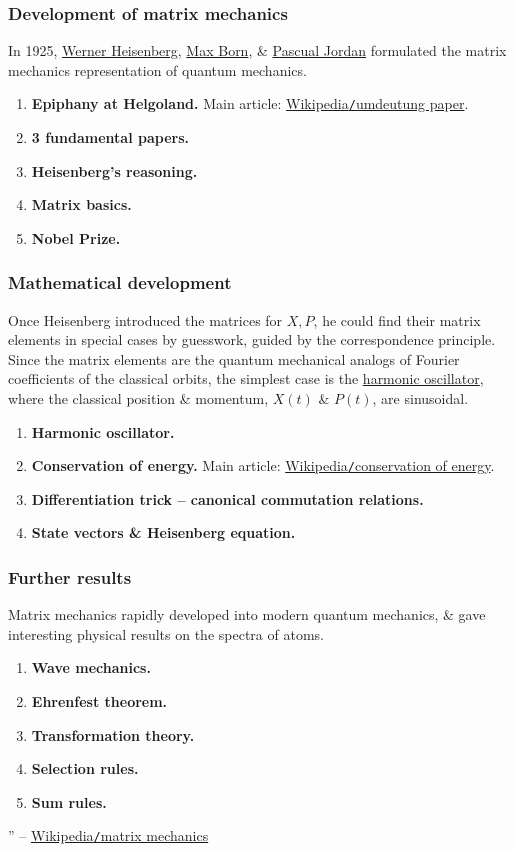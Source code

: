 \documentclass{article}
\begin{document}
\subsubsection{Development of matrix mechanics}
In 1925, \href{https://en.wikipedia.org/wiki/Werner_Heisenberg}{\sc Werner Heisenberg}, \href{https://en.wikipedia.org/wiki/Max_Born}{\sc Max Born}, \& \href{https://en.wikipedia.org/wiki/Pascual_Jordan}{\sc Pascual Jordan} formulated the matrix mechanics representation of quantum mechanics.
\begin{enumerate}
	\item {\bf Epiphany at Helgoland.} Main article: \href{https://en.wikipedia.org/wiki/Umdeutung_paper}{Wikipedia{\tt/}umdeutung paper}.
	\item {\bf3 fundamental papers.}
	\item {\bf Heisenberg's reasoning.}
	\item {\bf Matrix basics.}
	\item {\bf Nobel Prize.}
\end{enumerate}

\subsubsection{Mathematical development}
Once {\sc Heisenberg} introduced the matrices for $X,P$, he could find their matrix elements in special cases by guesswork, guided by the correspondence principle. Since the matrix elements are the quantum mechanical analogs of Fourier coefficients of the classical orbits, the simplest case is the \href{https://en.wikipedia.org/wiki/Harmonic_oscillator}{harmonic oscillator}, where the classical position \& momentum, $X(t)$ \& $P(t)$, are sinusoidal.
\begin{enumerate}
	\item {\bf Harmonic oscillator.}
	\item {\bf Conservation of energy.} Main article: \href{https://en.wikipedia.org/wiki/Conservation_of_energy}{Wikipedia{\tt/}conservation of energy}.
	\item {\bf Differentiation trick -- canonical commutation relations.}
	\item {\bf State vectors \& Heisenberg equation.}
\end{enumerate}

\subsubsection{Further results}
Matrix mechanics rapidly developed into modern quantum mechanics, \& gave interesting physical results on the spectra of atoms.
\begin{enumerate}
	\item {\bf Wave mechanics.}
	\item {\bf Ehrenfest theorem.}
	\item {\bf Transformation theory.}
	\item {\bf Selection rules.}
	\item {\bf Sum rules.}
\end{enumerate}
'' -- \href{https://en.wikipedia.org/wiki/Matrix_mechanics}{Wikipedia{\tt/}matrix mechanics}
\end{document}
